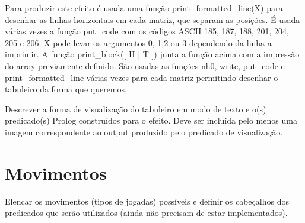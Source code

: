 \documentclass[a4paper]{article}
\begin{document}
Para produzir este efeito é usada uma função print\_formatted\_line(X) para desenhar as linhas horizontais em cada matriz, que separam as posições. É usada várias vezes a função put\_code com os códigos ASCII 185, 187, 188, 201, 204, 205 e 206. X pode levar os argumentos 0, 1,2 ou 3 dependendo da linha a imprimir. A função print\_block([ H | T ]) junta a função acima com a impressão do array previamente definido. São usadas as funções nh0, write, put\_code e print\_formatted\_line várias vezes para cada matriz permitindo desenhar o tabuleiro da forma que queremos.

Descrever a forma de visualização do tabuleiro em modo de texto e o(s) predicado(s) Prolog construídos para o efeito.
Deve ser incluída pelo menos uma imagem correspondente ao output produzido pelo predicado de visualização.


\section{Movimentos}

Elencar os movimentos (tipos de jogadas) possíveis e definir os cabeçalhos dos predicados que serão utilizados (ainda não precisam de estar implementados).
\end{document}
